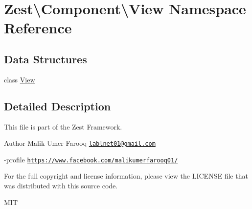 \hypertarget{namespace_zest_1_1_component_1_1_view}{}\section{Zest\textbackslash{}Component\textbackslash{}View Namespace Reference}
\label{namespace_zest_1_1_component_1_1_view}
\subsection*{Data Structures}
\begin{DoxyCompactItemize}
\item 
class \mbox{\hyperlink{class_zest_1_1_component_1_1_view_1_1_view}{View}}
\end{DoxyCompactItemize}


\subsection{Detailed Description}
This file is part of the Zest Framework.

\begin{DoxyAuthor}{Author}
Malik Umer Farooq \href{mailto:lablnet01@gmail.com}{\tt lablnet01@gmail.\+com} 

-\/profile \href{https://www.facebook.com/malikumerfarooq01/}{\tt https\+://www.\+facebook.\+com/malikumerfarooq01/}
\end{DoxyAuthor}
For the full copyright and license information, please view the L\+I\+C\+E\+N\+SE file that was distributed with this source code.

M\+IT 